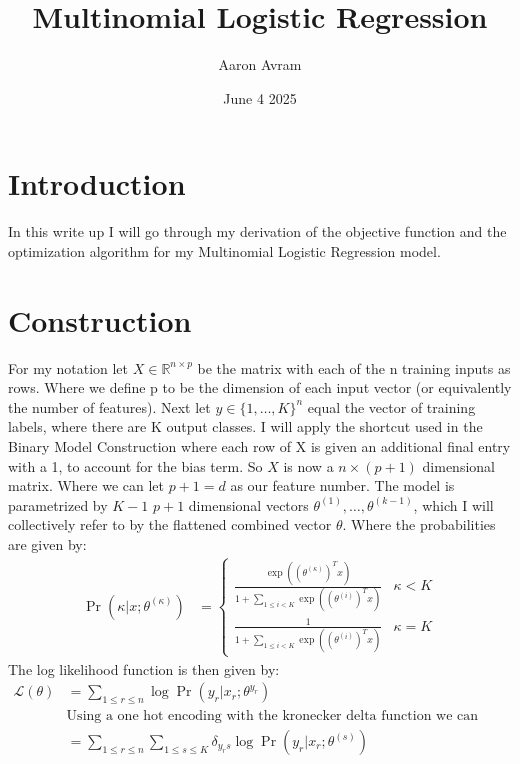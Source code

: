 \documentclass[12pt]{article}
\title{Multinomial Logistic Regression}
\author{Aaron Avram}
\date{June 4 2025}
\begin{document}
\maketitle

\section*{Introduction}
In this write up I will go through my derivation of the objective function and the optimization algorithm for my Multinomial
Logistic Regression model.

\section*{Construction}
For my notation let $X \in \mathbb{R}^{n \times p}$ be the matrix
with each of the n training inputs as rows. Where we define p to be the dimension
of each input vector (or equivalently the number of features). Next
let $y \in \{1, \ldots, K \}^n$ equal the vector of training labels, where there are K
output classes. I will apply the shortcut used in the Binary Model Construction
where each row of X is given an additional final entry with a 1, to account for the bias term. So $X$
is now a $n \times (p+1)$ dimensional matrix. Where we can let $p + 1 = d$ as our feature number. The model is parametrized by $K - 1$
$p + 1$ dimensional vectors $\theta^{(1)}, \ldots, \theta^{(k-1)}$, which I will collectively refer to by the
flattened combined vector $\theta$. Where the probabilities
are given by:
\begin{align*}
    \Pr(\kappa | x; \theta^{(\kappa)}) &= \begin{cases}
        \frac{\exp((\theta^{(\kappa)})^Tx)}{1 + \displaystyle \sum_{1 \leq i < K}\exp((\theta^{(i)})^Tx)} & \kappa < K \\
        \frac{1}{1 + \displaystyle \sum_{1 \leq i < K}\exp((\theta^{(i)})^Tx)} & \kappa = K
    \end{cases}
\end{align*}
The log likelihood function is then given by:
\begin{align*}
    \mathcal{L}(\theta) &= \displaystyle \sum_{1 \leq r \leq n}\log\Pr(y_r | x_r; \theta^{y_r}) \\
    &\text{Using a one hot encoding with the kronecker delta function we can write this as: } \\
    &= \displaystyle \sum_{1 \leq r \leq n} \sum_{1 \leq s \leq K}\delta_{y_rs}\log\Pr(y_r | x_r; \theta^{(s)}) \\
\end{align*}
\end{document}
